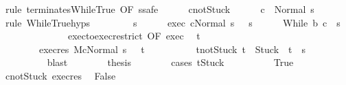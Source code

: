 \begin{isabellebody}
\ {\isacharparenleft}rule\ terminates{\isachardot}WhileTrue\ {\isacharbrackleft}OF\ s{\isacharbrackright}{\isacharcomma}safe{\isacharparenright}\isanewline
\ \ \ \ \isamarkupfalse%
\ c{\isacharunderscore}notStuck\isanewline
\ \ \ \ \isamarkupfalse%
\ {\isachardoublequoteopen}{\isasymGamma}{\isasymturnstile}c\ {\isasymdown}\ Normal\ s{\isachardoublequoteclose}\isanewline
\ \ \ \ \ \ \isamarkupfalse%
\ {\isacharparenleft}rule\ WhileTrue{\isachardot}hyps{\isacharparenright}\isanewline
\ \ \isamarkupfalse%
\isanewline
\ \ \ \ \isamarkupfalse%
\ s{\isacharprime}\isanewline
\ \ \ \ \isamarkupfalse%
\ exec{\isacharcolon}\ {\isachardoublequoteopen}{\isasymGamma}{\isasymturnstile}{\isasymlangle}c{\isacharcomma}Normal\ s\ {\isasymrangle}\ {\isasymRightarrow}\ s{\isacharprime}{\isachardoublequoteclose}\isanewline
\ \ \ \ \isamarkupfalse%
\ {\isachardoublequoteopen}{\isasymGamma}{\isasymturnstile}While\ b\ c\ {\isasymdown}\ s{\isacharprime}{\isachardoublequoteclose}\isanewline
\ \ \ \ \isamarkupfalse%
\ {\isacharminus}\isanewline
\ \ \ \ \ \ \isamarkupfalse%
\ exec{\isacharunderscore}to{\isacharunderscore}exec{\isacharunderscore}restrict\ {\isacharbrackleft}OF\ exec{\isacharbrackright}\ \isamarkupfalse%
\ t{\isacharprime}\ \isanewline
\ \ \ \ \ \ \ \ exec{\isacharunderscore}res{\isacharcolon}\ {\isachardoublequoteopen}{\isasymGamma}{\isacharbar}\isactrlbsub M\isactrlesub {\isasymturnstile}{\isasymlangle}c{\isacharcomma}Normal\ s\ {\isasymrangle}\ {\isasymRightarrow}\ t{\isacharprime}{\isachardoublequoteclose}\ \ \isanewline
\ \ \ \ \ \ \ \ t{\isacharprime}{\isacharunderscore}notStuck{\isacharcolon}\ {\isachardoublequoteopen}t{\isacharprime}\ {\isasymnoteq}\ Stuck\ {\isasymlongrightarrow}\ t{\isacharprime}\ {\isacharequal}\ s{\isacharprime}{\isachardoublequoteclose}\isanewline
\ \ \ \ \ \ \ \ \isamarkupfalse%
\ blast\isanewline
\ \ \ \ \ \ \isamarkupfalse%
\ {\isacharquery}thesis\isanewline
\ \ \ \ \ \ \isamarkupfalse%
\ {\isacharparenleft}cases\ {\isachardoublequoteopen}t{\isacharprime}{\isacharequal}Stuck{\isachardoublequoteclose}{\isacharparenright}\isanewline
\ \ \ \ \ \ \ \ \isamarkupfalse%
\ True\isanewline
\ \ \ \ \ \ \ \ \isamarkupfalse%
\ c{\isacharunderscore}notStuck\ exec{\isacharunderscore}res\ \isamarkupfalse%
\ {\isachardoublequoteopen}False{\isachardoublequoteclose}\isanewline

\end{isabellebody}
